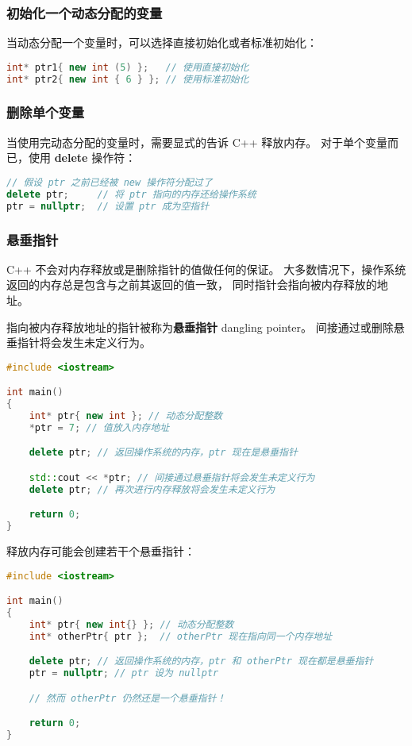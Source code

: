 \documentclass[../../LearnCpp.tex]{subfiles}
\begin{document}
\subsubsection*{初始化一个动态分配的变量}

当动态分配一个变量时，可以选择直接初始化或者标准初始化：

\begin{lstlisting}[language=C++]
int* ptr1{ new int (5) };   // 使用直接初始化
int* ptr2{ new int { 6 } }; // 使用标准初始化
\end{lstlisting}

\subsubsection*{删除单个变量}

当使用完动态分配的变量时，需要显式的告诉 C++ 释放内存。
对于单个变量而已，使用 \textbf{delete} 操作符：

\begin{lstlisting}[language=C++]
// 假设 ptr 之前已经被 new 操作符分配过了
delete ptr;     // 将 ptr 指向的内存还给操作系统
ptr = nullptr;  // 设置 ptr 成为空指针
\end{lstlisting}

\subsubsection*{悬垂指针}

C++ 不会对内存释放或是删除指针的值做任何的保证。
大多数情况下，操作系统返回的内存总是包含与之前其返回的值一致，
同时指针会指向被内存释放的地址。

指向被内存释放地址的指针被称为\textbf{悬垂指针} dangling pointer。
间接通过或删除悬垂指针将会发生未定义行为。

\begin{lstlisting}[language=C++]
#include <iostream>

int main()
{
    int* ptr{ new int }; // 动态分配整数
    *ptr = 7; // 值放入内存地址

    delete ptr; // 返回操作系统的内存，ptr 现在是悬垂指针

    std::cout << *ptr; // 间接通过悬垂指针将会发生未定义行为
    delete ptr; // 再次进行内存释放将会发生未定义行为

    return 0;
}
\end{lstlisting}

释放内存可能会创建若干个悬垂指针：

\begin{lstlisting}[language=C++]
#include <iostream>

int main()
{
    int* ptr{ new int{} }; // 动态分配整数
    int* otherPtr{ ptr };  // otherPtr 现在指向同一个内存地址

    delete ptr; // 返回操作系统的内存，ptr 和 otherPtr 现在都是悬垂指针
    ptr = nullptr; // ptr 设为 nullptr

    // 然而 otherPtr 仍然还是一个悬垂指针！

    return 0;
}
\end{lstlisting}
\end{document}
